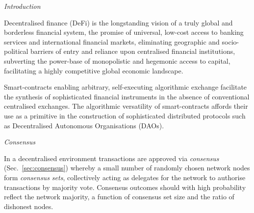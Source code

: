 \begin{center}\emph{Introduction}\end{center}

Decentralised finance (DeFi) is the longstanding vision of a truly global and borderless financial system, the promise of universal, low-cost access to banking services and international financial markets, eliminating geographic and socio-political barriers of entry and reliance upon centralised financial institutions, subverting the power-base of monopolistic and hegemonic access to capital, facilitating a highly competitive global economic landscape.

Smart-contracts enabling arbitrary, self-executing algorithmic exchange facilitate the synthesis of sophisticated financial instruments in the absence of conventional centralised exchanges. The algorithmic versatility of smart-contracts affords their use as a primitive in the construction of sophisticated distributed protocols such as Decentralised Autonomous Organisations (DAOs).


\begin{center}\emph{Consensus}\end{center}

In a decentralised environment transactions are approved via \emph{consensus} (Sec.~\ref{sec:consensus}) whereby a small number of randomly chosen network nodes form \emph{consensus sets}, collectively acting as delegates for the network to authorise transactions by majority vote. Consensus outcomes should with high probability reflect the network majority, a function of consensus set size and the ratio of dishonest nodes.

\begin{center}
	\vspace{2pt}
	\resizebox{0.6\columnwidth}{!}{}
\end{center}

